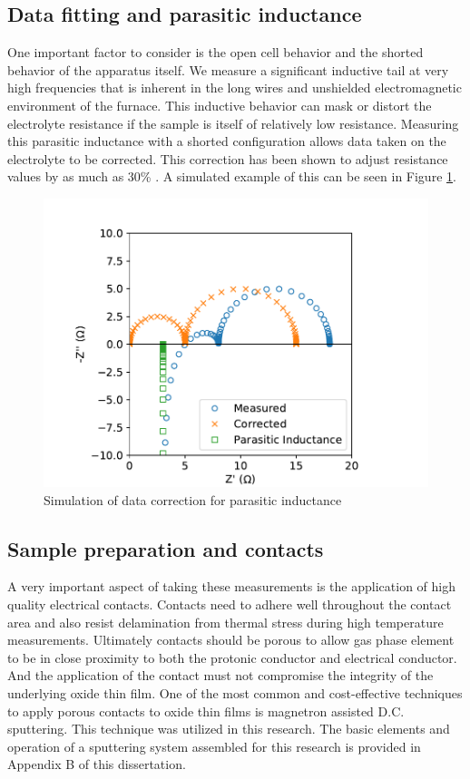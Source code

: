 \vspace{12pt}
\subsection{Data fitting and parasitic inductance}

One important factor to consider is the open cell behavior and the shorted behavior of the apparatus itself. We measure a significant inductive tail at very high frequencies that is inherent in the long wires and unshielded electromagnetic environment of the furnace. This inductive behavior can mask or distort the electrolyte resistance if the sample is itself of relatively low resistance. Measuring this parasitic inductance with a shorted configuration allows data taken on the electrolyte to be corrected. This correction has been shown to adjust resistance values by as much as 30\% \cite{Vladikova2006}. A simulated example of this can be seen in Figure \ref{meth:fig:inductanceCorrection}.

\begin{figure}[tb]
\centering
\includegraphics[width=.7\linewidth]{Figures/EIS-correction-sample.pdf}
\caption{Simulation of data correction for parasitic inductance}
\label{meth:fig:inductanceCorrection}
\end{figure}

\vspace{12pt}
\subsection{Sample preparation and contacts}
A very important aspect of taking these measurements is the application of high quality electrical contacts. Contacts need to adhere well throughout the contact area and also resist delamination from thermal stress during high temperature measurements. Ultimately contacts should be porous to allow gas phase element to be in close proximity to both the protonic conductor and electrical conductor. And the application of the contact must not compromise the integrity of the underlying oxide thin film. One of the most common and cost-effective techniques to apply porous contacts to oxide thin films is magnetron assisted D.C. sputtering. This technique was utilized in this  research. The basic elements and operation of a sputtering system assembled for this research is provided in Appendix B of this dissertation. 
